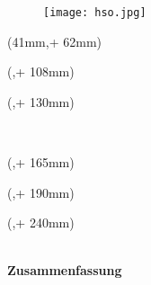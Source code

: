 \captionsetup[figure]{labelformat=empty}
\noindent 
\begin{figure}
  \texttt{[image: hso.jpg]}
  \caption[]{}
\end{figure}
\captionsetup[figure]{labelformat=simple}
\begin{textblock*}{128mm}(41mm,\seitenanfang + 62mm) %
  \centering\Large\sffamily
  \vspace{12mm} %
  \textbf{\hsmatitel}
\end{textblock*}%

\begin{textblock*}{\seitenbreite}(\bindekorrektur,\seitenanfang + 108mm)
  \centering\large\sffamily
  \hsmaautor
\end{textblock*}

\begin{textblock*}{\seitenbreite}(\bindekorrektur,\seitenanfang + 130mm)
  \centering\large\sffamily
  \textbf{\hsmatyp}\\
  \begin{small}\hsmathesistype \end{small}\\
  \vspace{6mm}
  \hsmastudiengangname
\end{textblock*}

\begin{textblock*}{\seitenbreite}(\bindekorrektur,\seitenanfang + 165mm)
  \centering\large\sffamily
  \hsmafakultaetlang\\
  \vspace{2mm}
  \hsmakoerperschaft
\end{textblock*}

\begin{textblock*}{\seitenbreite}(\bindekorrektur,\seitenanfang + 190mm)
  \centering\large 
  \textsf{\hsmadatum}
\end{textblock*}

\begin{textblock*}{\seitenbreite}(\bindekorrektur,\seitenanfang + 240mm)
  \centering\large\sffamily
  \hsmatutor \\
  \vspace{2mm}
  \hsmabetreuer\\
\end{textblock*}

\cleardoublepage

\thispagestyle{empty}
\textsf{\large\textbf{Zusammenfassung}}
\subsubsection*{\hsmatitelde}\hsmaabstractde

